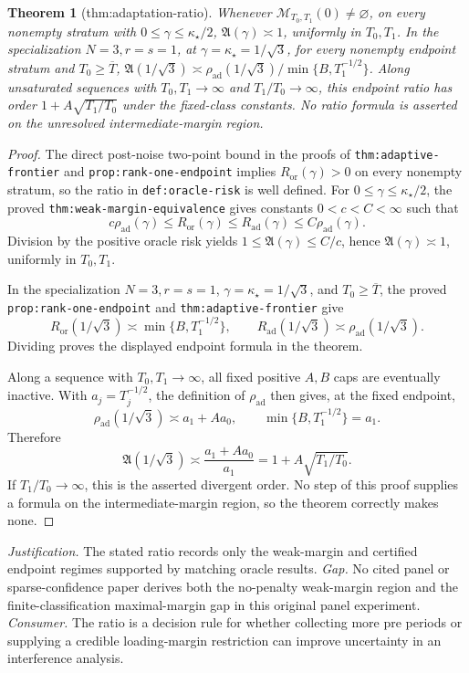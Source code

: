 \documentclass{article}
\newtheorem{theorem}{Theorem}
\begin{document}
\begin{theorem}[thm:adaptation-ratio]\label{thm:adaptation-ratio}
Whenever \(\mathcal M_{T_0,T_1}(0)\ne\varnothing\), on every nonempty stratum with \(0\le\gamma\le\kappa_\star/2\), \(\mathfrak A(\gamma)\asymp1\), uniformly in \(T_0,T_1\). In the specialization \(N=3,r=s=1\), at \(\gamma=\kappa_\star=1/\sqrt3\), for every nonempty endpoint stratum and \(T_0\ge\overline T\), \(\mathfrak A(1/\sqrt3)\asymp\rho_{\mathrm{ad}}(1/\sqrt3)/\min\{B,T_1^{-1/2}\}\). Along unsaturated sequences with \(T_0,T_1\to\infty\) and \(T_1/T_0\to\infty\), this endpoint ratio has order \(1+A\sqrt{T_1/T_0}\) under the fixed-class constants. No ratio formula is asserted on the unresolved intermediate-margin region.
\end{theorem}
\begin{proof}
The direct post-noise two-point bound in the proofs of \texttt{thm:adaptive-frontier} and \texttt{prop:rank-one-endpoint} implies \(R_{\mathrm{or}}(\gamma)>0\) on every nonempty stratum, so the ratio in \texttt{def:oracle-risk} is well defined.  For \(0\le\gamma\le\kappa_\star/2\), the proved \texttt{thm:weak-margin-equivalence} gives constants \(0<c<C<\infty\) such that
\[
 c\rho_{\mathrm{ad}}(\gamma)\le R_{\mathrm{or}}(\gamma)
 \le R_{\mathrm{ad}}(\gamma)\le C\rho_{\mathrm{ad}}(\gamma).
\]
Division by the positive oracle risk yields \(1\le\mathfrak A(\gamma)\le C/c\), hence \(\mathfrak A(\gamma)\asymp1\), uniformly in \(T_0,T_1\).

In the specialization \(N=3,r=s=1\), \(\gamma=\kappa_\star=1/\sqrt3\), and \(T_0\ge\overline T\), the proved \texttt{prop:rank-one-endpoint} and \texttt{thm:adaptive-frontier} give
\[
 R_{\mathrm{or}}(1/\sqrt3)\asymp\min\{B,T_1^{-1/2}\},
 \qquad
 R_{\mathrm{ad}}(1/\sqrt3)\asymp\rho_{\mathrm{ad}}(1/\sqrt3).
\]
Dividing proves the displayed endpoint formula in the theorem.

Along a sequence with \(T_0,T_1\to\infty\), all fixed positive \(A,B\) caps are eventually inactive.  With \(a_j=T_j^{-1/2}\), the definition of \(\rho_{\mathrm{ad}}\) then gives, at the fixed endpoint,
\[
 \rho_{\mathrm{ad}}(1/\sqrt3)
 \asymp a_1+A a_0,
 \qquad
 \min\{B,T_1^{-1/2}\}=a_1.
\]
Therefore
\[
 \mathfrak A(1/\sqrt3)
 \asymp\frac{a_1+Aa_0}{a_1}
 =1+A\sqrt{T_1/T_0}.
\]
If \(T_1/T_0\to\infty\), this is the asserted divergent order.  No step of this proof supplies a formula on the intermediate-margin region, so the theorem correctly makes none.
\end{proof}
\par\smallskip\noindent \textit{Justification.} The stated ratio records only the weak-margin and certified endpoint regimes supported by matching oracle results. \textit{Gap.} No cited panel or sparse-confidence paper derives both the no-penalty weak-margin region and the finite-classification maximal-margin gap in this original panel experiment. \textit{Consumer.} The ratio is a decision rule for whether collecting more pre periods or supplying a credible loading-margin restriction can improve uncertainty in an interference analysis.
\end{document}
